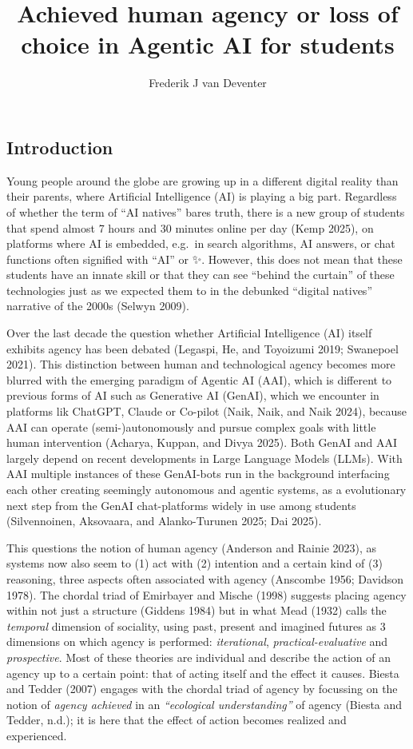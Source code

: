 \documentclass[
  letterpaper,
  DIV=11,
  numbers=noendperiod]{scrartcl}
\title{Achieved human agency or loss of choice in Agentic AI for
students}
\author{Frederik J van Deventer}
\date{}
\begin{document}
\maketitle


\subsection{Introduction}\label{introduction}

Young people around the globe are growing up in a different digital
reality than their parents, where Artificial Intelligence (AI) is
playing a big part. Regardless of whether the term of ``AI natives''
bares truth, there is a new group of students that spend almost 7 hours
and 30 minutes online per day (Kemp 2025), on platforms where AI is
embedded, e.g.~in search algorithms, AI answers, or chat functions often
signified with ``AI'' or ✨. However, this does not mean that these
students have an innate skill or that they can see ``behind the
curtain'' of these technologies just as we expected them to in the
debunked ``digital natives'' narrative of the 2000s (Selwyn 2009).

Over the last decade the question whether Artificial Intelligence (AI)
itself exhibits agency has been debated (Legaspi, He, and Toyoizumi
2019; Swanepoel 2021). This distinction between human and technological
agency becomes more blurred with the emerging paradigm of Agentic AI
(AAI), which is different to previous forms of AI such as Generative AI
(GenAI), which we encounter in platforms lik ChatGPT, Claude or Co-pilot
(Naik, Naik, and Naik 2024), because AAI can operate (semi-)autonomously
and pursue complex goals with little human intervention (Acharya,
Kuppan, and Divya 2025). Both GenAI and AAI largely depend on recent
developments in Large Language Models (LLMs). With AAI multiple
instances of these GenAI-bots run in the background interfacing each
other creating seemingly autonomous and agentic systems, as a
evolutionary next step from the GenAI chat-platforms widely in use among
students (Silvennoinen, Aksovaara, and Alanko-Turunen 2025; Dai 2025).

This questions the notion of human agency (Anderson and Rainie 2023), as
systems now also seem to (1) act with (2) intention and a certain kind
of (3) reasoning, three aspects often associated with agency (Anscombe
1956; Davidson 1978). The chordal triad of Emirbayer and Mische (1998)
suggests placing agency within not just a structure (Giddens 1984) but
in what Mead (1932) calls the \emph{temporal} dimension of sociality,
using past, present and imagined futures as 3 dimensions on which agency
is performed: \emph{iterational}, \emph{practical-evaluative} and
\emph{prospective}. Most of these theories are individual and describe
the action of an agency up to a certain point: that of acting itself and
the effect it causes. Biesta and Tedder (2007) engages with the chordal
triad of agency by focussing on the notion of \emph{agency achieved} in
an \emph{``ecological understanding''} of agency (Biesta and Tedder,
n.d.); it is here that the effect of action becomes realized and
experienced.
\end{document}

